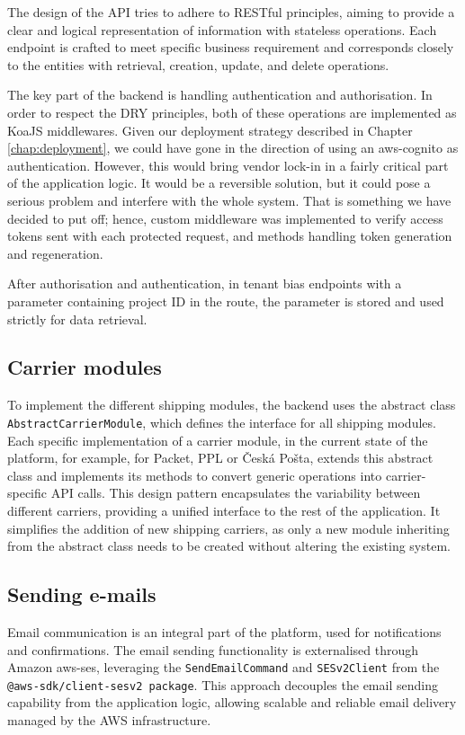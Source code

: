 The design of the API tries to adhere to RESTful principles, aiming to provide a clear and logical representation of information with stateless operations.
Each endpoint is crafted to meet specific business requirement and corresponds closely to the entities with retrieval, creation, update, and delete operations.

The key part of the backend is handling authentication and authorisation. 
In order to respect the \ac{DRY} principles, both of these operations are implemented as KoaJS middlewares.
Given our deployment strategy described in Chapter \ref{chap:deployment}, we could have gone in the direction of using an \gls{aws-cognito} as authentication.
However, this would bring vendor lock-in in a fairly critical part of the application logic.
It would be a reversible solution, but it could pose a serious problem and interfere with the whole system.
That is something we have decided to put off; hence, custom middleware was implemented to verify access tokens sent with each protected request, and methods handling token generation and regeneration.

After authorisation and authentication, in tenant bias endpoints with a parameter containing project ID in the route, the parameter is stored and used strictly for data retrieval.

\subsection{Carrier modules}
To implement the different shipping modules, the backend uses the abstract class \texttt{AbstractCarrierModule}, which defines the interface for all shipping modules.
Each specific implementation of a carrier module, in the current state of the platform, for example, for Packet, PPL or Česká Pošta, extends this abstract class and implements its methods to convert generic operations into carrier-specific API calls. 
This design pattern encapsulates the variability between different carriers, providing a unified interface to the rest of the application. 
It simplifies the addition of new shipping carriers, as only a new module inheriting from the abstract class needs to be created without altering the existing system.

\subsection{Sending e-mails}
Email communication is an integral part of the platform, used for notifications and confirmations. 
The email sending functionality is externalised through Amazon \gls{aws-ses}, leveraging the \texttt{SendEmailCommand} and \texttt{SESv2Client} from the \texttt{@aws-sdk/client-sesv2 package}. This approach decouples the email sending capability from the application logic, allowing scalable and reliable email delivery managed by the AWS infrastructure.

